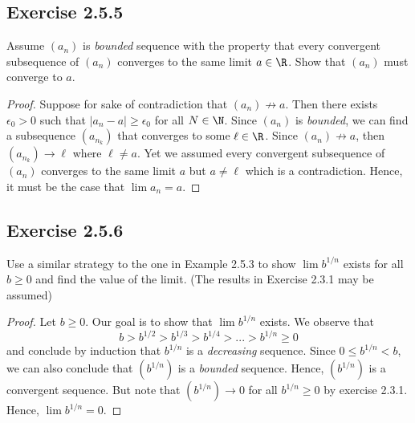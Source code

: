 \subsection{Exercise 2.5.5} Assume \((a_n)\) is \textit{bounded} sequence with the property that every convergent subsequence of \((a_n)\) converges to the same limit \(a \in \R\). Show that \((a_n)\) must converge to \(a\).
\begin{proof}
    Suppose for sake of contradiction that \((a_n) \not\to a\). Then there exists \(\epsilon_0 > 0\) such that \(|a_n - a| \geq \epsilon_0\) for all \(N \in \N \). Since \((a_n)\) is \textit{bounded}, we can find a subsequence \((a_{n_k})\) that converges to some \( \ell \in \R \). Since \((a_n) \not\to a\), then \( (a_{n_k}) \to \ell \) where \( \ell \neq a\). Yet we assumed every convergent subsequence of \((a_n)\) converges to the same limit \( a \) but \( a \neq \ell \) which is a contradiction. Hence, it must be the case that \( \lim a_n = a \).
\end{proof}
\subsection{Exercise 2.5.6}
Use a similar strategy to the one in Example 2.5.3 to show \(\lim b^{1/n} \) exists for all \( b \geq 0\) and find the value of the limit. (The results in Exercise 2.3.1 may be assumed)
\begin{proof}
    Let \(b \geq 0 \). Our goal is to show that \( \lim b^{1/n}\) exists. We observe that 
    \[b > b^{1/2} > b^{1/3} > b^{1/4} > ... >  b^{1/n} \geq 0\]
    and conclude by induction that \(b^{1/n}\) is a \textit{decreasing}
    sequence. Since \( 0 \leq b^{1/n} < b\), we can also conclude that \( (b^{1/n})\) is a \textit{bounded} sequence. Hence, \((b^{1/n})\) is a convergent sequence. But note that \((b^{1/n}) \to 0\) for all \(b^{1/n} \geq 0\) by exercise 2.3.1. Hence, \(\lim b^{1/n} = 0\).
\end{proof}

